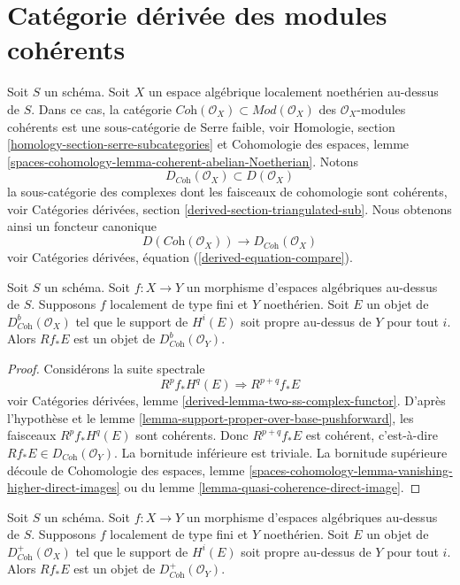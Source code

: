 \section{Catégorie dérivée des modules cohérents}
\label{section-derived-coherent}

\noindent
Soit $S$ un schéma. Soit $X$ un espace algébrique localement noethérien au-dessus de $S$.
Dans ce cas, la catégorie
$\textit{Coh}(\mathcal{O}_X) \subset \textit{Mod}(\mathcal{O}_X)$
des $\mathcal{O}_X$-modules cohérents est une sous-catégorie de Serre faible, voir
Homologie, section \ref{homology-section-serre-subcategories}
et
Cohomologie des espaces, lemme
\ref{spaces-cohomology-lemma-coherent-abelian-Noetherian}.
Notons
$$
D_{\textit{Coh}}(\mathcal{O}_X) \subset D(\mathcal{O}_X)
$$
la sous-catégorie des complexes dont les faisceaux de cohomologie sont cohérents, voir
Catégories dérivées, section \ref{derived-section-triangulated-sub}.
Nous obtenons ainsi un foncteur canonique
\begin{equation}
\label{equation-compare-coherent}
D(\textit{Coh}(\mathcal{O}_X))
\longrightarrow
D_{\textit{Coh}}(\mathcal{O}_X)
\end{equation}
voir Catégories dérivées, équation (\ref{derived-equation-compare}).

\begin{lemma}
\label{lemma-direct-image-coherent}
Soit $S$ un schéma. Soit $f : X \to Y$ un morphisme d'espaces algébriques
au-dessus de $S$. Supposons $f$ localement de type fini et $Y$ noethérien.
Soit $E$ un objet de $D^b_{\textit{Coh}}(\mathcal{O}_X)$ tel que le
support de $H^i(E)$ soit propre au-dessus de $Y$ pour tout $i$.
Alors $Rf_*E$ est un objet de $D^b_{\textit{Coh}}(\mathcal{O}_Y)$.
\end{lemma}

\begin{proof}
Considérons la suite spectrale
$$
R^pf_*H^q(E) \Rightarrow R^{p + q}f_*E
$$
voir Catégories dérivées, lemme \ref{derived-lemma-two-ss-complex-functor}.
D'après l'hypothèse et le lemme \ref{lemma-support-proper-over-base-pushforward},
les faisceaux $R^pf_*H^q(E)$ sont cohérents. Donc
$R^{p + q}f_*E$ est cohérent, c'est-à-dire $Rf_*E \in D_{\textit{Coh}}(\mathcal{O}_Y)$.
La bornitude inférieure est triviale. La bornitude supérieure
découle de
Cohomologie des espaces, lemme
\ref{spaces-cohomology-lemma-vanishing-higher-direct-images}
ou du
lemme \ref{lemma-quasi-coherence-direct-image}.
\end{proof}

\begin{lemma}
\label{lemma-direct-image-coherent-bdd-below}
Soit $S$ un schéma. Soit $f : X \to Y$ un morphisme d'espaces algébriques
au-dessus de $S$. Supposons $f$ localement de type fini et $Y$ noethérien.
Soit $E$ un objet de $D^+_{\textit{Coh}}(\mathcal{O}_X)$ tel que le support de $H^i(E)$
soit propre au-dessus de $Y$ pour tout $i$.
Alors $Rf_*E$ est un objet de $D^+_{\textit{Coh}}(\mathcal{O}_Y)$.
\end{lemma}


